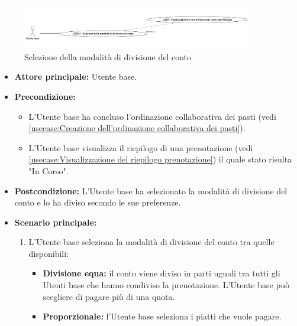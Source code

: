 \label{usecase:Selezione della modalità di divisione del conto}

\begin{figure}[h]
	\centering
	\includegraphics[width=0.9\textwidth]{./uml/UCB14.png} 
	\caption{Selezione della modalità di divisione del conto}
	\label{fig:UCB14}
  \end{figure}

\begin{itemize}
	\item \textbf{Attore principale:} Utente base.
	
	\item \textbf{Precondizione:}
	\begin{itemize}
		\item L'Utente base ha concluso l'ordinazione collaborativa dei pasti (vedi \autoref{usecase:Creazione dell'ordinazione collaborativa dei pasti}).
		\item L'Utente base visualizza il riepilogo di una prenotazione (vedi \autoref{usecase:Visualizzazione del riepilogo prenotazione}) il quale stato risulta "In Corso". 
	\end{itemize}

	\item \textbf{Postcondizione:}
	      L'Utente base ha selezionato la modalità di divisione del conto e lo ha diviso secondo le sue preferenze.
	\item \textbf{Scenario principale:}
	      \begin{enumerate}
		      \item L'Utente base seleziona la modalità di divisione del conto
		            tra quelle disponibili:
					\begin{itemize}
						\item \textbf{Divisione equa:} il conto viene diviso in parti
							  uguali tra tutti gli Utenti base che hanno condiviso la
							  prenotazione. L'Utente base può scegliere di pagare più di
							  una quota.
		  
						\item \textbf{Proporzionale:} l'Utente base seleziona i piatti che vuole
							  pagare.
					\end{itemize}


\end{enumerate}
\end{itemize}
